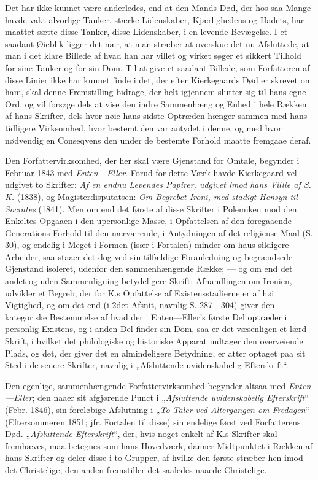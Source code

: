 \documentclass[12pt,a4paper]{book}
\begin{document}
Det har ikke kunnet være anderledes, end at den Mands Død, der hos saa
Mange havde vakt alvorlige Tanker, stærke Lidenskaber, Kjærlighedens og
Hadets, har maattet sætte disse Tanker, disse Lidenskaber, i en levende
Bevægelse. I et saadant Øieblik ligger det nær, at man stræber at overskue
det nu Afsluttede, at man i det klare Billede af hvad han har villet og
virket søger et sikkert Tilhold for sine Tanker og for sin Dom. Til at give
et saadant Billede, som Forfatteren af disse Linier ikke har kunnet finde i
det, der efter Kierkegaards Død er skrevet om ham, skal denne Fremstilling
bidrage, der helt igjennem slutter sig til hans egne Ord, og vil forsøge
dels at vise den indre Sammenhæng og Enhed i hele Rækken af hans Skrifter,
dels hvor nøie hans sidste Optræden hænger sammen med hans tidligere
Virksomhed, hvor bestemt den var antydet i denne, og med hvor nødvendig en
Conseqvens den under de bestemte Forhold maatte fremgaae deraf.

Den Forfattervirksomhed, der her skal være Gjenstand for Omtale, begynder i
Februar 1843 med \emph{Enten---Eller}. Forud for dette Værk havde
Kierkegaard vel udgivet to Skrifter: \emph{Af en endnu Levendes Papirer,
udgivet imod hans Villie af S. K.} (1838), og Magisterdisputatsen:
\emph{Om Begrebet Ironi, med stadigt Hensyn til Socrates} (1841). Men om end
det første af disse Skrifter i Polemiken mod den Enkeltes Opgaaen i den
upersonlige Masse, i Opfattelsen af den foregaaende Generations Forhold til
den nærværende, i Antydningen af det religieuse Maal (S. 30), og endelig i
Meget i Formen (især i Fortalen) minder om haus sildigere Arbeider, saa
staaer det dog ved sin tilfældige Foranledning og begrændsede Gjenstand
isoleret, udenfor den sammenhængende Række; --- og om end det andet og uden
Sammenligning betydeligere Skrift: Afhandlingen om Ironien, udvikler et
Begreb, der for K.s Opfattelse af Existensstadierne er af høi Vigtighed, og
om det end (i 2det Afsnit, navnlig S. 287---304) giver den kategoriske
Bestemmelse af hvad der i Enten---Eller's første Del optræder i personlig
Existens, og i anden Del finder sin Dom, saa er det væsenligen et lærd
Skrift, i hvilket det philologiske og historiske Apparat indtager den
overveiende Plads, og det, der giver det en almindeligere Betydning, er
atter optaget paa sit Sted i de senere Skrifter, navnlig i „Afsluttende
uvidenskabelig Efterskrift“.

Den egenlige, sammenhængende Forfattervirksomhed begynder altsaa med
\emph{Enten---Eller}; den naaer sit afgjørende Punct i „\emph{Afsluttende
uvidenskabelig Efterskrift}“ (Febr. 1846), sin foreløbige Afslutning i
„\emph{To Taler ved Altergangen om Fredagen}“ (Eftersommeren 1851; jfr.
Fortalen til disse) sin endelige først ved Forfatterens Død.
„\emph{Afsluttende Efterskrift}“, der, hvis noget enkelt af K.s Skrifter
skal fremhæves, maa betegnes som hans Hovedværk, danner Midtpunktet i
Rækken af hans Skrifter og deler disse i to Grupper, af hvilke den første
stræber hen imod det Christelige, den anden fremstiller det saaledes naaede
Christelige.
\end{document}
